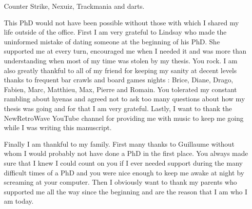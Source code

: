 Counter Strike, Nexuiz, Trackmania and darts.

This PhD would not have been possible without those with which I shared my life outside of the office. First I am very grateful to Lindsay who made the uninformed mistake of dating someone at the beginning of his PhD. She supported me at every turn, encouraged me when I needed it and was more than understanding when most of my time was stolen by my thesis. You rock. I am also greatly thankful to all of my friend for keeping my sanity at decent levels thanks to frequent bar crawls and board games nights : Brice, Diane, Drago, Fabien, Marc, Matthieu, Max, Pierre and Romain. You tolerated my constant rambling about hyenas and agreed not to ask too many questions about how my thesis was going and for that I am very grateful. Lastly, I want to thank the NewRetroWave YouTube channel for providing me with music to keep me going while I was writing this manuscript.

Finally I am thankful to my family. First many thanks to Guillaume without whom I would probably not have done a PhD in the first place. You always made sure that I knew I could count on you if I ever needed support during the many difficult times of a PhD and you were nice enough to keep me awake at night by screaming at your computer. Then I obviously want to thank my parents who supported me all the way since the beginning and are the reason that I am who I am today.

